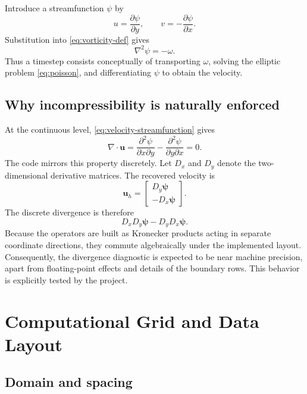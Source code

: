 \documentclass[11pt,a4paper]{article}
\begin{document}
Introduce a streamfunction $\psi$ by
\begin{equation}
 u=\frac{\partial\psi}{\partial y},
 \qquad
 v=-\frac{\partial\psi}{\partial x}.
\label{eq:velocity-streamfunction}
\end{equation}
Substitution into \cref{eq:vorticity-def} gives
\begin{equation}
\nabla^2\psi=-\omega.
\label{eq:poisson}
\end{equation}
Thus a timestep consists conceptually of transporting $\omega$, solving the elliptic problem \cref{eq:poisson}, and differentiating $\psi$ to obtain the velocity.

\subsection{Why incompressibility is naturally enforced}

At the continuous level, \cref{eq:velocity-streamfunction} gives
\[
\nabla\cdot\bm{u}
=\frac{\partial^2\psi}{\partial x\partial y}
-\frac{\partial^2\psi}{\partial y\partial x}=0.
\]
The code mirrors this property discretely.  Let $D_x$ and $D_y$ denote the two-dimensional derivative matrices.  The recovered velocity is
\begin{equation}
\bm{u}_h =
\begin{bmatrix}
D_y\bm{\psi}\\
-D_x\bm{\psi}
\end{bmatrix}.
\end{equation}
The discrete divergence is therefore
\begin{equation}
D_xD_y\bm{\psi}-D_yD_x\bm{\psi}.
\end{equation}
Because the operators are built as Kronecker products acting in separate coordinate directions, they commute algebraically under the implemented layout.  Consequently, the divergence diagnostic is expected to be near machine precision, apart from floating-point effects and details of the boundary rows.  This behavior is explicitly tested by the project.

\section{Computational Grid and Data Layout}

\subsection{Domain and spacing}
\end{document}
